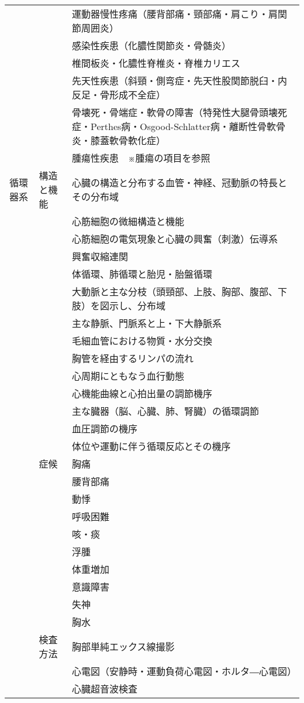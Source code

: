 \begin{xltabular}{\linewidth}{XXX}
 &  & 運動器慢性疼痛（腰背部痛・頸部痛・肩こり・肩関節周囲炎） \\
 &  & 感染性疾患（化膿性関節炎・骨髄炎） \\
 &  & 椎間板炎・化膿性脊椎炎・脊椎カリエス \\
 &  & 先天性疾患（斜頸・側弯症・先天性股関節脱臼・内反足・骨形成不全症） \\
 &  & 骨壊死・骨端症・軟骨の障害（特発性大腿骨頭壊死症・Perthes病・Osgood-Schlatter病・離断性骨軟骨炎・膝蓋軟骨軟化症） \\
 &  & 腫瘍性疾患　※腫瘍の項目を参照 \\
循環器系 & 構造と機能 & 心臓の構造と分布する血管・神経、冠動脈の特長とその分布域 \\
 &  & 心筋細胞の微細構造と機能 \\
 &  & 心筋細胞の電気現象と心臓の興奮（刺激）伝導系 \\
 &  & 興奮収縮連関 \\
 &  & 体循環、肺循環と胎児・胎盤循環 \\
 &  & 大動脈と主な分枝（頭頸部、上肢、胸部、腹部、下肢）を図示し、分布域 \\
 &  & 主な静脈、門脈系と上・下大静脈系 \\
 &  & 毛細血管における物質・水分交換 \\
 &  & 胸管を経由するリンパの流れ \\
 &  & 心周期にともなう血行動態 \\
 &  & 心機能曲線と心拍出量の調節機序 \\
 &  & 主な臓器（脳、心臓、肺、腎臓）の循環調節 \\
 &  & 血圧調節の機序 \\
 &  & 体位や運動に伴う循環反応とその機序 \\
 & 症候 & 胸痛 \\
 &  & 腰背部痛 \\
 &  & 動悸 \\
 &  & 呼吸困難 \\
 &  & 咳・痰 \\
 &  & 浮腫 \\
 &  & 体重増加 \\
 &  & 意識障害 \\
 &  & 失神 \\
 &  & 胸水 \\
 & 検査方法 & 胸部単純エックス線撮影 \\
 &  & 心電図（安静時・運動負荷心電図・ホルタ―心電図） \\
 &  & 心臓超音波検査 \\

\end{xltabular}
